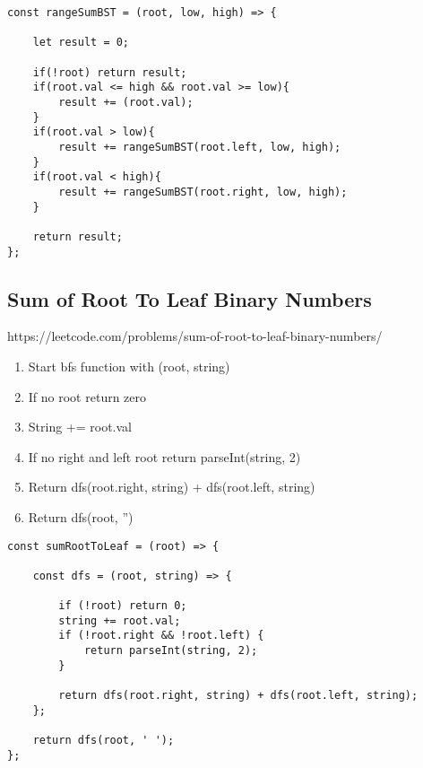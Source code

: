 \documentclass[10pt]{article}
\begin{document}
\begin{lstlisting}[title=Solution rangeSumBST, captionpos=t]
const rangeSumBST = (root, low, high) => {
    
    let result = 0;
    
    if(!root) return result;
    if(root.val <= high && root.val >= low){
        result += (root.val);
    }
    if(root.val > low){
        result += rangeSumBST(root.left, low, high);
    }
    if(root.val < high){
        result += rangeSumBST(root.right, low, high);
    }
    
    return result; 
};
\end{lstlisting}

\medskip %












\pagebreak
\medskip   
\subsection{Sum of Root To Leaf Binary Numbers}
https://leetcode.com/problems/sum-of-root-to-leaf-binary-numbers/

\begin{enumerate}
	\item Start bfs function with (root, string)
	\item If no root return zero 
	\item String += root.val
	\item If no right and left root return parseInt(string, 2)
	\item Return dfs(root.right, string) + dfs(root.left, string)
	\item Return dfs(root, '')
\end{enumerate}

\begin{lstlisting}[title=Solution sumRootToLeaf, captionpos=t]
const sumRootToLeaf = (root) => {
    
    const dfs = (root, string) => {
        
        if (!root) return 0;
        string += root.val;
        if (!root.right && !root.left) {
            return parseInt(string, 2);
        }
        
        return dfs(root.right, string) + dfs(root.left, string);
    };
    
    return dfs(root, ' ');
};
\end{lstlisting}
\end{document}
